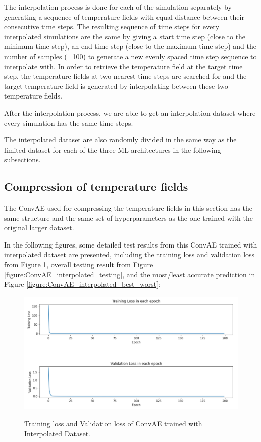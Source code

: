 The interpolation process is done for each of the simulation separately by generating a sequence of temperature fields with equal distance between their consecutive time steps. The resulting sequence of time steps for every interpolated simulations are the same by giving a start time step (close to the minimum time step), an end time step (close to the maximum time step) and the number of samples (=100) to generate a new evenly spaced time step sequence to interpolate with. In order to retrieve the temperature field at the target time step, the temperature fields at two nearest time steps are searched for and the target temperature field is generated by interpolating between these two temperature fields.

After the interpolation process, we are able to get an interpolation dataset where every simulation has the same time steps.

The interpolated dataset are also randomly divided in the same way as the limited dataset for each of the three ML architectures in the following subsections.


\subsection{Compression of temperature fields}

The ConvAE used for compressing the temperature fields in this section has the same structure and the same set of hyperparameters as the one trained with the original larger dataset.

In the following figures, some detailed test results from this ConvAE trained with interpolated dataset are presented, including the training loss and validation loss from Figure \ref{figure:ConvAE_interpolated_losses}, overall testing result from Figure \ref{figure:ConvAE_interpolated_testing}, and the most/least accurate prediction in Figure \ref{figure:ConvAE_interpolated_best_worst}:


\begin{figure}[H]
    \caption{Training loss and Validation loss of ConvAE trained with Interpolated Dataset.}
    \includegraphics[scale=0.6]{figures/mantle_convection_images/larger_dataset_interpolated/ConvAE_trainingData.png}
    \label{figure:ConvAE_interpolated_losses}
\end{figure}

